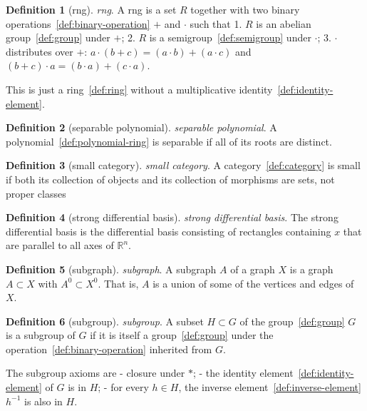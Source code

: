 \documentclass[12pt,a4paper]{article}
\theoremstyle{definition}
\newtheorem{definition}{Definition}
\begin{document}
\begin{definition}[rng]\label{def:rng}
\emph{rng}. A rng is a set $R$ together with two binary operations~\ref{def:binary-operation} $+$ and $\cdot$ such that
1. $R$ is an abelian group~\ref{def:group} under $+$;
2. $R$ is a semigroup~\ref{def:semigroup} under $\cdot$;
3. $\cdot$ distributes over $+$: $a\cdot (b+c)=(a\cdot b) + (a\cdot c)$ and $(b+c)\cdot a = (b\cdot a) + (c\cdot a)$.

This is just a ring~\ref{def:ring} without a multiplicative identity~\ref{def:identity-element}.
\end{definition}

\begin{definition}[separable polynomial]\label{def:separable-polynomial}
\emph{separable polynomial}. A polynomial~\ref{def:polynomial-ring} is separable if all of its roots are distinct.
\end{definition}

\begin{definition}[small category]\label{def:small-category}
\emph{small category}. A category~\ref{def:category} is small if both its collection of objects and its collection of morphisms are sets, not proper classes
\end{definition}

\begin{definition}[strong differential basis]\label{def:strong-differential-basis}
\emph{strong differential basis}. The strong differential basis is the differential basis consisting of rectangles containing $x$ that are parallel to all axes of $\mathbb R^n$.
\end{definition}

\begin{definition}[subgraph]\label{def:subgraph}
\emph{subgraph}. A subgraph $A$ of a graph $X$ is a graph $A\subset X$ with $A^0\subset X^0$. That is, $A$ is a union of some of the vertices and edges of $X$.
\end{definition}

\begin{definition}[subgroup]\label{def:subgroup}
\emph{subgroup}. A subset $H\subset G$ of the group~\ref{def:group} $G$ is a subgroup of $G$ if it is itself a group~\ref{def:group} under the operation~\ref{def:binary-operation} inherited from $G$.

The subgroup axioms are
- closure under $*$;
- the identity element~\ref{def:identity-element} of $G$ is in $H$;
- for every $h\in H$, the inverse element~\ref{def:inverse-element} $h^{-1}$ is also in $H$.
\end{definition}
\end{document}
